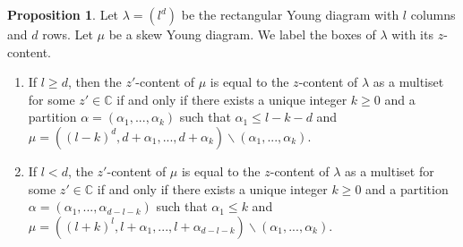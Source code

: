 \documentclass[11pt]{amsart}
\numberwithin{equation}{section}
\theoremstyle{definition}
\newtheorem{proposition}[thm]{Proposition}
\begin{document}
\begin{proposition}\label{shape for same central character}
    Let $\lambda=(l^{d})$ be the rectangular Young diagram with  $l$ columns and $d$ rows. Let $\mu$ be a skew Young diagram. We label the boxes of $\lambda$ with its $z$-content.
    \begin{enumerate}
        \item If $l\geq d$, then the $z'$-content of $\mu$ is equal to the $z$-content of $\lambda$ as a multiset for some \(z' \in \mathbb C\) if and only if there exists a unique integer $k \geq 0$ and a partition $\alpha=(\alpha_{1},...,\alpha_{k})$ such that $\alpha_{1}\leq l-k-d$  and $\mu=((l-k)^{d}, d+\alpha_{1},...,d+\alpha_{k})\backslash(\alpha_{1},...,\alpha_{k})$.
        \item If $l<d$, the $z'$-content of $\mu$ is equal to the $z$-content of $\lambda$ as a multiset for some \(z' \in \mathbb C\) if and only if there exists a unique integer $k \geq 0$ and a partition $\alpha=(\alpha_{1},...,\alpha_{d-l-k})$ such that  $\alpha_{1}\leq k$ and $\mu=((l+k)^{l}, l+\alpha_{1},...,l+\alpha_{d-l-k})\backslash(\alpha_{1},...,\alpha_{k})$.
    \end{enumerate}
   
\end{proposition}
\end{document}
